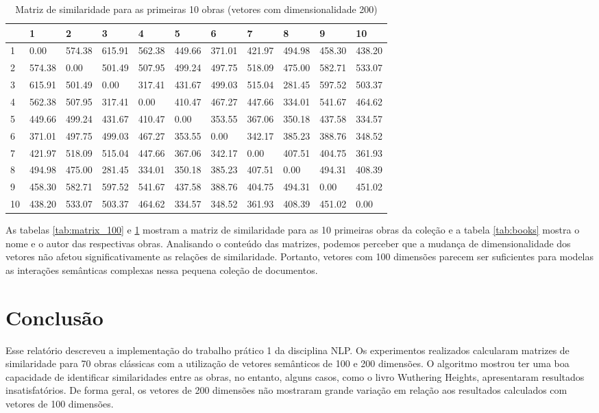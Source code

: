 \documentclass{article}
\begin{document}
\begin{table}[h]
  \begin{center}
    \tiny
    \begin{tabular}{| l | l | l | l | l | l | l | l | l | l | l |}
    \hline
 & 1 & 2 & 3 & 4 & 5 & 6 & 7 & 8 & 9 & 10 \\
    \hline
1 & 0.00 & 574.38 & 615.91 & 562.38 & 449.66 & 371.01 & 421.97 & 494.98 & 458.30 & 438.20 \\
2 & 574.38 & 0.00 & 501.49 & 507.95 & 499.24 & 497.75 & 518.09 & 475.00 & 582.71 & 533.07 \\
3 & 615.91 & 501.49 & 0.00 & 317.41 & 431.67 & 499.03 & 515.04 & 281.45 & 597.52 & 503.37 \\
4 & 562.38 & 507.95 & 317.41 & 0.00 & 410.47 & 467.27 & 447.66 & 334.01 & 541.67 & 464.62 \\
5 & 449.66 & 499.24 & 431.67 & 410.47 & 0.00 & 353.55 & 367.06 & 350.18 & 437.58 & 334.57 \\
6 & 371.01 & 497.75 & 499.03 & 467.27 & 353.55 & 0.00 & 342.17 & 385.23 & 388.76 & 348.52 \\
7 & 421.97 & 518.09 & 515.04 & 447.66 & 367.06 & 342.17 & 0.00 & 407.51 & 404.75 & 361.93 \\
8 & 494.98 & 475.00 & 281.45 & 334.01 & 350.18 & 385.23 & 407.51 & 0.00 & 494.31 & 408.39 \\
9 & 458.30 & 582.71 & 597.52 & 541.67 & 437.58 & 388.76 & 404.75 & 494.31 & 0.00 & 451.02 \\
10 & 438.20 & 533.07 & 503.37 & 464.62 & 334.57 & 348.52 & 361.93 & 408.39 & 451.02 & 0.00 \\
    \hline
    \end{tabular}
    \caption{Matriz de similaridade para as primeiras 10 obras (vetores com dimensionalidade 200)} 
    \label{tab:matrix_200}
  \end{center}
\end{table}

As tabelas \ref{tab:matrix_100} e \ref{tab:matrix_200} mostram a matriz de similaridade para as 10
primeiras obras da coleção e a tabela \ref{tab:books} mostra o nome e o autor das respectivas obras.
Analisando o conteúdo das matrizes, podemos perceber que a mudança de dimensionalidade dos vetores 
não afetou significativamente as relações de similaridade. Portanto, vetores com 100 dimensões parecem
ser suficientes para modelas as interações semânticas complexas nessa pequena coleção de documentos.

\section{Conclusão}

Esse relatório descreveu a implementação do trabalho prático 1 da disciplina NLP. Os experimentos realizados
calcularam matrizes de similaridade para 70 obras clássicas com a utilização de vetores semânticos de
100 e 200 dimensões. O algoritmo mostrou ter uma boa capacidade de identificar similaridades entre as obras,
no entanto, alguns casos, como o livro Wuthering Heights, apresentaram resultados insatisfatórios. De forma
geral, os vetores de 200 dimensões não mostraram grande variação em relação aos resultados calculados com
vetores de 100 dimensões.
\end{document}
